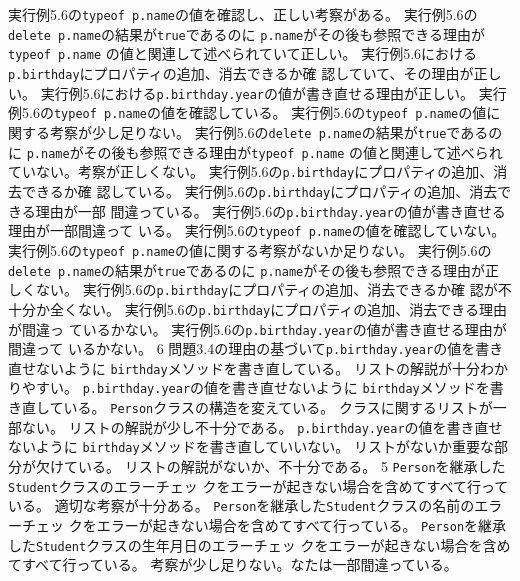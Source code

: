 {{ {実行例5.6の\texttt{typeof p.name}の値を確認し、正しい考察がある。}
 {実行例5.6の\texttt{delete p.name}の結果が\texttt{true}であるのに
  \texttt{p.name}がその後も参照できる理由が\texttt{typeof p.name}
 の値と関連して述べられていて正しい。}
 {実行例5.6における\texttt{p.birthday}にプロパティの追加、消去できるか確
 認していて、その理由が正しい。}
 {実行例5.6における\texttt{p.birthday.year}の値が書き直せる理由が正しい。}
 }
 {
 {実行例5.6の\texttt{typeof p.name}の値を確認している。}
 {実行例5.6の\texttt{typeof p.name}の値に関する考察が少し足りない。}
 {実行例5.6の\texttt{delete p.name}の結果が\texttt{true}であるのに
  \texttt{p.name}がその後も参照できる理由が\texttt{typeof p.name}
 の値と関連して述べられていない。考察が正しくない。}
 {実行例5.6の\texttt{p.birthday}にプロパティの追加、消去できるか確
 認している。}
 {実行例5.6の\texttt{p.birthday}にプロパティの追加、消去できる理由が一部
 間違っている。}
 {実行例5.6の\texttt{p.birthday.year}の値が書き直せる理由が一部間違って
 いる。}
 }
 {
 {実行例5.6の\texttt{typeof p.name}の値を確認していない。}
 {実行例5.6の\texttt{typeof p.name}の値に関する考察がないか足りない。}
 {実行例5.6の\texttt{delete p.name}の結果が\texttt{true}であるのに
  \texttt{p.name}がその後も参照できる理由が正しくない。}
 {実行例5.6の\texttt{p.birthday}にプロパティの追加、消去できるか確
 認が不十分か全くない。}
 {実行例5.6の\texttt{p.birthday}にプロパティの追加、消去できる理由が間違っ
 ているかない。}
 {実行例5.6の\texttt{p.birthday.year}の値が書き直せる理由が間違って
 いるかない。}
 }
 {}{6}{
 {問題3.4の理由の基づいて\newline\texttt{p.birthday.year}の値を書き直せないように
 \texttt{birthday}メソッドを書き直している。}
 {リストの解説が十分わかりやすい。}
 }
 {
 {\texttt{p.birthday.year}の値を書き直せないように
 \texttt{birthday}メソッドを書き直している。}
 {\texttt{Person}クラスの構造を変えている。}
 {クラスに関するリストが一部ない。}
 {リストの解説が少し不十分である。}
 }
 {
 {\texttt{p.birthday.year}の値を書き直せないように
 \texttt{birthday}メソッドを書き直していいない。}
 {リストがないか重要な部分が欠けている。}
 {リストの解説がないか、不十分である。}
 }
 {}{5}{
 {\texttt{Person}を継承した\texttt{Student}クラスのエラーチェッ
   クをエラーが起きない場合を含めてすべて行っている。}
 {適切な考察が十分ある。}
 }
 {
 {\texttt{Person}を継承した\texttt{Student}クラスの名前のエラーチェッ
   クをエラーが起きない場合を含めてすべて行っている。}
 {\texttt{Person}を継承した\texttt{Student}クラスの生年月日のエラーチェッ
   クをエラーが起きない場合を含めてすべて行っている。}
 {考察が少し足りない。なたは一部間違っている。}
}}
